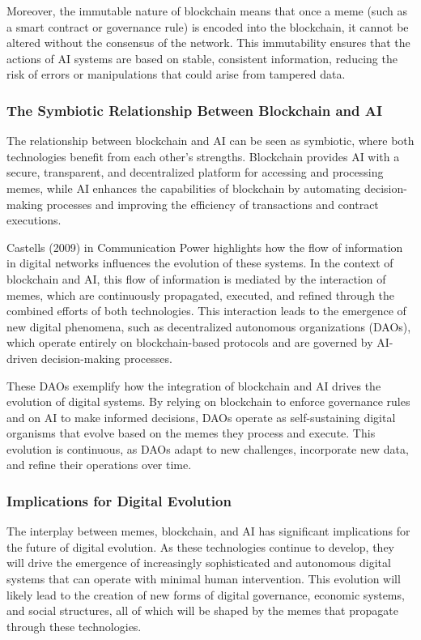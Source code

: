 \documentclass[12pt,twoside]{article}
\begin{document}
Moreover, the immutable nature of blockchain means that once a meme (such as a smart contract or governance rule) is encoded into the blockchain, it cannot be altered without the consensus of the network. This immutability ensures that the actions of AI systems are based on stable, consistent information, reducing the risk of errors or manipulations that could arise from tampered data.

\subsubsection{The Symbiotic Relationship Between Blockchain and AI}

The relationship between blockchain and AI can be seen as symbiotic, where both technologies benefit from each other’s strengths. Blockchain provides AI with a secure, transparent, and decentralized platform for accessing and processing memes, while AI enhances the capabilities of blockchain by automating decision-making processes and improving the efficiency of transactions and contract executions.

Castells (2009) in Communication Power highlights how the flow of information in digital networks influences the evolution of these systems. In the context of blockchain and AI, this flow of information is mediated by the interaction of memes, which are continuously propagated, executed, and refined through the combined efforts of both technologies. This interaction leads to the emergence of new digital phenomena, such as decentralized autonomous organizations (DAOs), which operate entirely on blockchain-based protocols and are governed by AI-driven decision-making processes.

These DAOs exemplify how the integration of blockchain and AI drives the evolution of digital systems. By relying on blockchain to enforce governance rules and on AI to make informed decisions, DAOs operate as self-sustaining digital organisms that evolve based on the memes they process and execute. This evolution is continuous, as DAOs adapt to new challenges, incorporate new data, and refine their operations over time.

\subsubsection{Implications for Digital Evolution}

The interplay between memes, blockchain, and AI has significant implications for the future of digital evolution. As these technologies continue to develop, they will drive the emergence of increasingly sophisticated and autonomous digital systems that can operate with minimal human intervention. This evolution will likely lead to the creation of new forms of digital governance, economic systems, and social structures, all of which will be shaped by the memes that propagate through these technologies.
\end{document}
